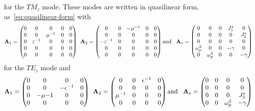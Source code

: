 for the $TM_z$ mode. These modes are written in quasilinear form, as~\eqref{eq:quasilinear-form} with
\begin{align*}
  \mathbf{A}_1 = 
  \begin{pmatrix}
    0 & 0 & 0 & 0 & 0 \\
    0 & 0 & \mu^{-1} & 0 & 0 \\
    0 & \varepsilon^{-1} & 0 & 0 & 0 \\
    0 & 0 & 0 & 0 & 0 \\
    0 & 0 & 0 & 0 & 0 \\
  \end{pmatrix}
  \: \:
  \mathbf{A}_2 = 
  \begin{pmatrix}
    0 & 0 &-\mu^{-1} & 0 & 0 \\
    0 & 0 & 0 & 0 & 0 \\
   -\varepsilon^{-1} & 0 & 0 & 0 & 0 \\
    0 & 0 & 0 & 0 & 0 \\
    0 & 0 & 0 & 0 & 0 \\
  \end{pmatrix}
  \textrm{and}\;\;\;
  \mathbf{A}_s = 
  \begin{pmatrix}
    0 & 0 & 0 & J_{1}^* & 0 \\
    0 & 0 & 0 & 0 & J_{2}^* \\
    0 & 0 & 0 & 0 & 0 \\
    \omega_p^2 & 0 & 0 & -\gamma & 0 \\
    0 & \omega_p^2 & 0 & 0 & -\gamma \\
  \end{pmatrix}
\end{align*}
for the $TE_z$ mode and 
\begin{align*}
  \mathbf{A}_1 = 
  \begin{pmatrix}
    0 & 0 & 0 & 0 \\
    0 & 0 &-\epsilon^{-1} & 0 \\
    0 &-\mu{-1} & 0 & 0 \\
    0 & 0 & 0 & 0 \\
  \end{pmatrix}
  \: \:
  \mathbf{A}_2 = 
  \begin{pmatrix}
    0 & 0 & \epsilon^{-1} & 0 \\
    0 & 0 & 0 & 0 \\
    \mu^{-1} & 0 & 0 & 0 \\
    0 & 0 & 0 & 0 \\
  \end{pmatrix}
  \textrm{and}\;\;\;
  \mathbf{A}_s = 
  \begin{pmatrix}
    0 & 0 & 0 & 0 \\
    0 & 0 & 0 & 0 \\
    0 & 0 & 0 & J_{3}^* \\
    0 & 0 & \omega_p^2 & -\gamma \\
  \end{pmatrix}
\end{align*}

